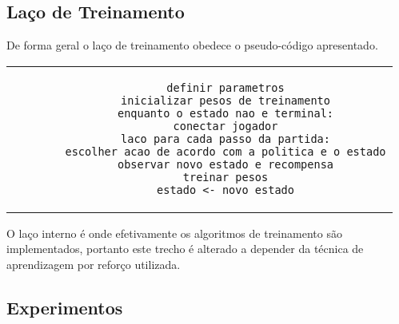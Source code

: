 \subsection{Laço de Treinamento}

De forma geral o laço de treinamento obedece o pseudo-código apresentado.

\begin{tabular}{c}
	\begin{lstlisting}
		definir parametros
		inicializar pesos de treinamento
		enquanto o estado nao e terminal:
		conectar jogador
		laco para cada passo da partida:
		escolher acao de acordo com a politica e o estado
		observar novo estado e recompensa
		treinar pesos
		estado <- novo estado
	\end{lstlisting}
\end{tabular}

O laço interno é onde efetivamente os algoritmos de treinamento são implementados, portanto este trecho é alterado a depender da técnica de aprendizagem por reforço utilizada.


\subsection{Experimentos}

